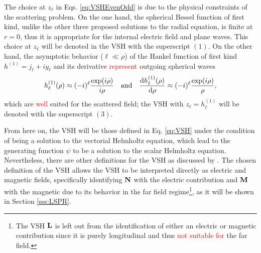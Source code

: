 The choice at $z_\ell$ in Eqs. \eqref{eq:VSHEvenOdd} is due to the physical constraints of the scattering problem. On the one hand, the spherical Bessel function of first kind, unlike the other three proposed solutions to the radial equation, is finite at $r = 0$, thus it is appropriate for the internal electric field and plane waves. This choice at $z_\ell$ will be denoted in the VSH with the superscript $(1)$. On the other hand, the asymptotic behavior ($\ell\ll \rho$) of the Hankel function of first kind $h^{(1)} = j_\ell + i y_\ell$ and its derivative \textcolor{red}{represent} outgoing spherical waves \cite{bohren_absorption_1983}
%
%
%
%
%
\begin{align}
	h_\ell^{(1)}(\rho)\approx (-i)^\ell \frac{\exp(i\rho)}{i\rho}
		\qqtext{and}
	\dv{h_\ell^{(1)}(\rho)}{\rho} \approx (-i)^\ell \frac{\exp(i\rho)}{\rho},
\end{align}
which are \textcolor{red}{well} suited for the scattered field; the VSH with $z_\ell = h^{(1)}_\ell$ will be denoted with the superscript $(3)$.

From here on, the VSH will be those defined in Eq. \eqref{eq:VSH} under the condition of being a solution to the vectorial Helmholtz equation, which lead to the generating function $\psi$ to be a solution to the scalar Helmholtz equation. Nevertheless, there are other definitions for the VSH as discussed by \citeauthor{barrera_vector_1985} \cite{barrera_vector_1985}. The chosen definition of the VSH allows the VSH to be interpreted directly as electric and magnetic fields, specifically identifying $\vb{N}$ with the electric contribution and $\vb{M}$ with the magnetic due to its behavior in the far field regime\footnote{The VSH $\vb{L}$ is left out from the identification of either an electric or magnetic contribution since it is purely longitudinal and thus \textcolor{red}{not suitable for} the far field.}, as it will be shown in Section \ref{sss:LSPR}.
